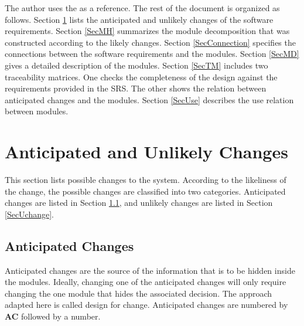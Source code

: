 \documentclass[12pt, titlepage]{article}
\begin{document}
The author uses the \cite{Smith2016} as a reference. The rest of the document is organized as follows. Section
\ref{SecChange} lists the anticipated and unlikely changes of the software
requirements. Section \ref{SecMH} summarizes the module decomposition that
was constructed according to the likely changes. Section \ref{SecConnection}
specifies the connections between the software requirements and the
modules. Section \ref{SecMD} gives a detailed description of the
modules. Section \ref{SecTM} includes two traceability matrices. One checks
the completeness of the design against the requirements provided in the SRS. The other shows the relation between anticipated changes and the modules. Section \ref{SecUse} describes the use relation between modules.

\section{Anticipated and Unlikely Changes} \label{SecChange}

This section lists possible changes to the system. According to the likeliness
of the change, the possible changes are classified into two
categories. Anticipated changes are listed in Section \ref{SecAchange}, and
unlikely changes are listed in Section \ref{SecUchange}.

\subsection{Anticipated Changes} \label{SecAchange}

Anticipated changes are the source of the information that is to be hidden
inside the modules. Ideally, changing one of the anticipated changes will only
require changing the one module that hides the associated decision. The approach
adapted here is called design for change. Anticipated changes are numbered by \textbf{AC} followed by a number.
\end{document}
